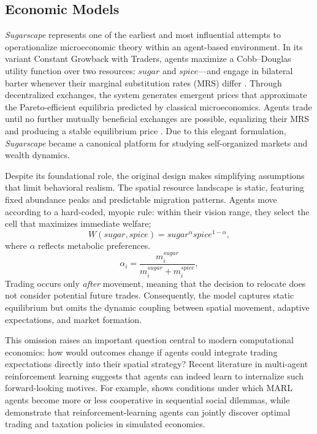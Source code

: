 \documentclass[pdflatex,sn-mathphys-num]{sn-jnl}%
\theoremstyle{thmstyleone}%
\theoremstyle{thmstyletwo}%
\theoremstyle{thmstylethree}%
\begin{document}

\subsection{Economic Models}

\textit{Sugarscape} represents one of the earliest and most influential attempts to operationalize microeconomic theory within an agent-based environment.  
In its variant Constant Growback with Traders, agents maximize a Cobb--Douglas utility function over two resources: \(sugar\) and \(spice\)---and engage in bilateral barter whenever their marginal substitution rates (MRS) differ \citep{EpsteinAxtell1996}.  
Through decentralized exchanges, the system generates emergent prices that approximate the Pareto-efficient equilibria predicted by classical microeconomics.  
Agents trade until no further mutually beneficial exchanges are possible, equalizing their MRS and producing a stable equilibrium price \citep{Axtell2005}.  
Due to this elegant formulation, \textit{Sugarscape} became a canonical platform for studying self-organized markets and wealth dynamics.

Despite its foundational role, the original design makes simplifying assumptions that limit behavioral realism.  
The spatial resource landscape is static, featuring fixed abundance peaks and predictable migration patterns.  
Agents move according to a hard-coded, myopic rule: within their vision range, they select the cell that maximizes immediate welfare;
\[
W(sugar, spice) = sugar^{\alpha} spice^{1-\alpha},
\]
where $\alpha$ reflects metabolic preferences.  
\[
\alpha_i = \frac{m^{sugar}_i}{m^{sugar}_i + m^{spice}_i},
\]
Trading occurs only \emph{after} movement, meaning that the decision to relocate does not consider potential future trades.  
Consequently, the model captures static equilibrium but omits the dynamic coupling between spatial movement, adaptive expectations, and market formation.

This omission raises an important question central to modern computational economics:  
how would outcomes change if agents could integrate trading expectations directly into their spatial strategy?  
Recent literature in multi-agent reinforcement learning suggests that agents can indeed learn to internalize such forward-looking motives.  
For example, \citet{Leibo2017} shows conditions under which MARL agents become more or less cooperative in sequential social dilemmas, while \citet{Zheng2022} demonstrate that reinforcement-learning agents can jointly discover optimal trading and taxation policies in simulated economies. 
\end{document}
